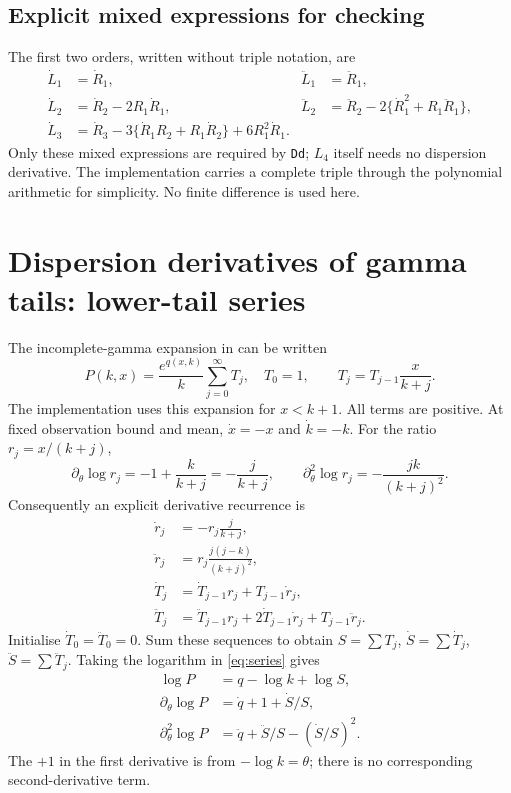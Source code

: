 \documentclass[11pt,a4paper]{article}
\newcommand{\code}[1]{\texttt{#1}}
\begin{document}
\subsection{Explicit mixed expressions for checking}
The first two orders, written without triple notation, are
\begin{align}
 \dot L_1&=\dot R_1,& \ddot L_1&=\ddot R_1,\\
 \dot L_2&=\dot R_2-2R_1\dot R_1,&
 \ddot L_2&=\ddot R_2-2\{\dot R_1^2+R_1\ddot R_1\},\\
 \dot L_3&=\dot R_3-3\{\dot R_1R_2+R_1\dot R_2\}
                +6R_1^2\dot R_1.\nonumber
\end{align}
Only these mixed expressions are required by \code{Dd}; $L_4$ itself needs no
dispersion derivative. The implementation carries a complete triple through
the polynomial arithmetic for simplicity. No finite difference is used here.

\newpage
\section{Dispersion derivatives of gamma tails: lower-tail series}
\label{sec:series}
The incomplete-gamma expansion in \cite{dlmfseries} can be written
\begin{equation}
 P(k,x)=\frac{e^{q(x,k)}}{k}\sum_{j=0}^{\infty}T_j,
 \quad T_0=1,\qquad T_j=T_{j-1}\frac{x}{k+j}.
 \label{eq:series}
\end{equation}
The implementation uses this expansion for $x<k+1$. All terms are positive.
At fixed observation bound and mean, $\dot x=-x$ and $\dot k=-k$.
For the ratio $r_j=x/(k+j)$,
\[
 \partial_\theta\log r_j=-1+\frac{k}{k+j}=-\frac{j}{k+j},
 \qquad
 \partial_\theta^2\log r_j=-\frac{jk}{(k+j)^2}.
\]
Consequently an explicit derivative recurrence is
\begin{align}
 \dot r_j&=-r_j\frac{j}{k+j},\\
 \ddot r_j&=r_j\frac{j(j-k)}{(k+j)^2},\\
 \dot T_j&=\dot T_{j-1}r_j+T_{j-1}\dot r_j,\\
 \ddot T_j&=\ddot T_{j-1}r_j+2\dot T_{j-1}\dot r_j+T_{j-1}\ddot r_j.
\end{align}
Initialise $\dot T_0=\ddot T_0=0$. Sum these sequences to obtain
$S=\sum T_j$, $\dot S=\sum\dot T_j$, $\ddot S=\sum\ddot T_j$.
Taking the logarithm in \eqref{eq:series} gives
\begin{align}
 \log P&=q-\log k+\log S,\\
 \partial_\theta\log P&=\dot q+1+\dot S/S,\\
 \partial_\theta^2\log P&=\ddot q+\ddot S/S-(\dot S/S)^2.
 \label{eq:seriesderivs}
\end{align}
The $+1$ in the first derivative is from $-\log k=\theta$; there is no
corresponding second-derivative term.
\end{document}
